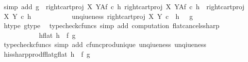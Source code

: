 \begin{isabellebody}
\ {\isacharparenleft}{\kern0pt}simp\ add{\isacharcolon}{\kern0pt}\ {\isacartoucheopen}g\ {\isacharequal}{\kern0pt}\ right{\isacharunderscore}{\kern0pt}cart{\isacharunderscore}{\kern0pt}proj\ X\ Y\isactrlbsup A\isactrlesup \isactrlsub f\ {\isasymcirc}\isactrlsub c\ h\isactrlsup {\isasymflat}\isactrlsup {\isasymsharp}{\isacartoucheclose}\ {\isacartoucheopen}right{\isacharunderscore}{\kern0pt}cart{\isacharunderscore}{\kern0pt}proj\ X\ Y\isactrlbsup A\isactrlesup \isactrlsub f\ {\isasymcirc}\isactrlsub c\ h\isactrlsup {\isasymflat}\isactrlsup {\isasymsharp}\ {\isacharequal}{\kern0pt}\ {\isacharparenleft}{\kern0pt}right{\isacharunderscore}{\kern0pt}cart{\isacharunderscore}{\kern0pt}proj\ X\ Y\ {\isasymcirc}\isactrlsub c\ h\isactrlsup {\isasymflat}{\isacharparenright}{\kern0pt}\isactrlsup {\isasymsharp}{\isacartoucheclose}{\isacharparenright}{\kern0pt}\isanewline
\ \ \ \ \ \ \ \ \isamarkupfalse%
\ \isamarkupfalse%
\ unqiueness{}{\isacharcolon}{\kern0pt}\ {\isachardoublequoteopen}{\isacharparenleft}{\kern0pt}right{\isacharunderscore}{\kern0pt}cart{\isacharunderscore}{\kern0pt}proj\ X\ Y{\isacharparenright}{\kern0pt}\ {\isasymcirc}\isactrlsub c\ \ h\isactrlsup {\isasymflat}\ {\isacharequal}{\kern0pt}\ \ g\isactrlsup {\isasymflat}{\isachardoublequoteclose}\isanewline
\ \ \ \ \ \ \ \ \ \ \isamarkupfalse%
\ h{\isacharunderscore}{\kern0pt}type\ g{\isacharunderscore}{\kern0pt}type\ \isamarkupfalse%
\ {\isacharparenleft}{\kern0pt}typecheck{\isacharunderscore}{\kern0pt}cfuncs{\isacharcomma}{\kern0pt}\ simp\ add{\isacharcolon}{\kern0pt}\ computation{}\ flat{\isacharunderscore}{\kern0pt}cancels{\isacharunderscore}{\kern0pt}sharp{\isacharparenright}{\kern0pt}\isanewline
\ \ \ \ \ \ \ \ \isamarkupfalse%
\ \isamarkupfalse%
\ h{\isacharunderscore}{\kern0pt}flat{\isacharcolon}{\kern0pt}\ {\isachardoublequoteopen}h\isactrlsup {\isasymflat}\ {\isacharequal}{\kern0pt}\ {\isasymlangle}f\isactrlsup {\isasymflat}{\isacharcomma}{\kern0pt}\ g\isactrlsup {\isasymflat}{\isasymrangle}{\isachardoublequoteclose}\isanewline
\ \ \ \ \ \ \ \ \ \ \isamarkupfalse%
\ {\isacharparenleft}{\kern0pt}typecheck{\isacharunderscore}{\kern0pt}cfuncs{\isacharcomma}{\kern0pt}\ simp\ add{\isacharcolon}{\kern0pt}\ cfunc{\isacharunderscore}{\kern0pt}prod{\isacharunderscore}{\kern0pt}unique\ unqiueness{}\ unqiueness{}{\isacharparenright}{\kern0pt}\isanewline
\ \ \ \ \ \ \ \ \isamarkupfalse%
\ \isamarkupfalse%
\ h{\isacharunderscore}{\kern0pt}is{\isacharunderscore}{\kern0pt}sharp{\isacharunderscore}{\kern0pt}prod{\isacharunderscore}{\kern0pt}fflat{\isacharunderscore}{\kern0pt}gflat{\isacharcolon}{\kern0pt}\ {\isachardoublequoteopen}h\ {\isacharequal}{\kern0pt}\ {\isasymlangle}f\isactrlsup {\isasymflat}{\isacharcomma}{\kern0pt}\ g\isactrlsup {\isasymflat}{\isasymrangle}\isactrlsup {\isasymsharp}{\isachardoublequoteclose}\isanewline

\end{isabellebody}

